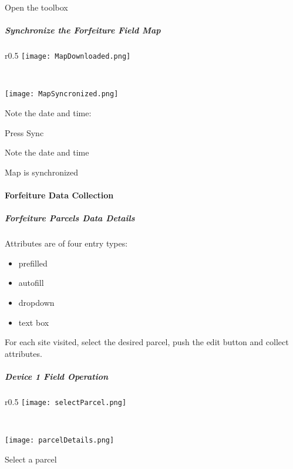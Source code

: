 \noindent Open the toolbox
\vspace{.5in}

\noindent{}
\clearpage
\subparagraph[Synchronize the Forfeiture Field Map]{\Large Synchronize the Forfeiture Field Map}
\begin{wrapfigure}{r}{0.5\textwidth}
\centering
    \texttt{[image: MapDownloaded.png]}
\caption{Map Downloaded}
\vspace{.25in}

\HRule \\[.4cm] %
\vspace{.25in}

    \texttt{[image: MapSyncronized.png]}
\caption{Map Synchronized}
\end{wrapfigure}
Note the date and time:
\vspace{1.5in}

\noindent Press {\LARGE Sync}
\vspace{2in}

\noindent Note the date and time
\vspace{1.25in}

{\Large Map is synchronized}
\clearpage
\paragraph{Forfeiture Data Collection}
\subparagraph{Forfeiture Parcels Data Details}

Attributes are of four entry types:
\begin{itemize}
\item prefilled
\item autofill
\item dropdown
\item text box
\end{itemize}
For each site visited, select the desired parcel, push the edit button and collect attributes.
\clearpage
\subparagraph[Device 1 Field Operation]{Device 1 Field Operation\texorpdfstring{\\}{}}
\begin{wrapfigure}{r}{0.5\textwidth}
\centering
    \texttt{[image: selectParcel.png]}
\caption {Select Parcel}
\vspace{.25in}

\HRule \\[.4cm] %
\vspace{.25in}

\centering
    \texttt{[image: parcelDetails.png]}
\caption{Parcel Details}
\end{wrapfigure}
Select a parcel
\vspace{4in}

